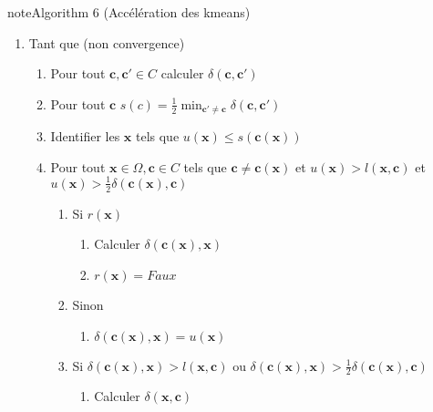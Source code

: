 \documentclass[letterpaper,10pt,english]{jupyterBook}
\begin{document}
\begin{sphinxadmonition}{note}{Algorithm 6 (Accélération des k\sphinxhyphen{}means)}
\begin{enumerate}
\begin{enumerate}
\item {} 
\sphinxAtStartPar
\(u(\mathbf x,\mathbf c)=\displaystyle\min_{\mathbf c\in C} \delta(\mathbf x,\mathbf c)\)

\end{enumerate}

\item {} 
\sphinxAtStartPar
Tant que (non convergence)
\begin{enumerate}
%
\item {} 
\sphinxAtStartPar
Pour tout \(\mathbf c,\mathbf {c'}\in C\) calculer \(\delta (\mathbf c,\mathbf {c'})\)

\item {} 
\sphinxAtStartPar
Pour tout \(\mathbf c\) \(s(c)= \frac{1}{2}\displaystyle\min_{\mathbf {c'}\neq \mathbf c} \delta(\mathbf c,\mathbf {c'})\)

\item {} 
\sphinxAtStartPar
Identifier les \(\mathbf x\) tels que \(u(\mathbf x)\leq s(\mathbf c(\mathbf x))\)

\item {} 
\sphinxAtStartPar
Pour tout \(\mathbf x\in \Omega,\mathbf c\in C\) tels que \(\mathbf c\neq \mathbf c(\mathbf x)\) et \(u(\mathbf x)>l(\mathbf x,\mathbf c)\) et \(u(\mathbf x)>\frac{1}{2}\delta(\mathbf c(\mathbf x),\mathbf c)\)
\begin{enumerate}
%
\item {} 
\sphinxAtStartPar
Si \(r(\mathbf x)\)
\begin{enumerate}
%
\item {} 
\sphinxAtStartPar
Calculer \(\delta(\mathbf c(\mathbf x),\mathbf x)\)

\item {} 
\sphinxAtStartPar
\(r(\mathbf x)=Faux\)

\end{enumerate}

\item {} 
\sphinxAtStartPar
Sinon
\begin{enumerate}
%
\item {} 
\sphinxAtStartPar
\(\delta(\mathbf c(\mathbf x),\mathbf x)=u(\mathbf x)\)

\end{enumerate}

\item {} 
\sphinxAtStartPar
Si \(\delta(\mathbf c(\mathbf x),\mathbf x)>l(\mathbf x,\mathbf c)\)  ou \(\delta(\mathbf c(\mathbf x),\mathbf x)>\frac{1}{2}\delta(\mathbf c(\mathbf x),\mathbf c)\)
\begin{enumerate}
%
\item {} 
\sphinxAtStartPar
Calculer \(\delta(\mathbf x,\mathbf c)\)


\end{enumerate}
\end{enumerate}
\end{enumerate}
\end{enumerate}
\end{sphinxadmonition}
\end{document}
